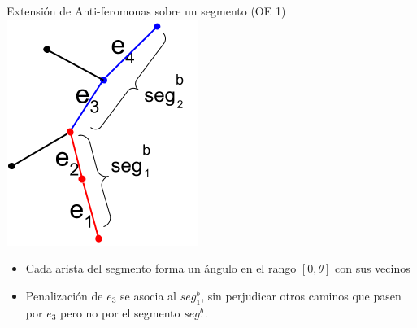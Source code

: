 \begin{frame}{Extensi\'on de Anti-feromonas sobre un segmento (OE 1)}
    \centering
    \includegraphics[scale=0.4]{Pictures/ant_segments_simple_case.png}
    \begin{itemize}
        \item Cada arista del segmento forma un \'angulo en el rango $[0, \theta]$ con sus vecinos
        \item Penalizaci\'on de $e_3$ se asocia al $seg^{b}_{1}$, sin perjudicar otros caminos que pasen por $e_3$ pero no por el segmento $seg^{b}_{1}$.
    \end{itemize}
\end{frame}



